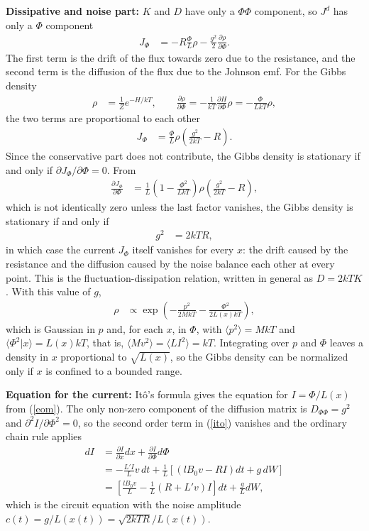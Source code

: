 \documentclass[11pt]{article}
\begin{document}
{\bf Dissipative and noise part:} $K$ and $D$ have only a $\Phi\Phi$ component, so $J^d$ has only a $\Phi$ component
\begin{align}
  J_{\Phi}&=-R\frac{\Phi}{L}\rho-\frac{g^2}{2}\frac{\partial\rho}{\partial\Phi}.
  \label{jphi}
\end{align}
The first term is the drift of the flux towards zero due to the resistance, and the second term is the diffusion of the flux due to the Johnson emf. For the Gibbs density
\begin{align}
  \rho&=\frac{1}{Z}e^{-H/kT},\qquad\frac{\partial\rho}{\partial\Phi}=-\frac{1}{kT}\frac{\partial H}{\partial\Phi}\rho=-\frac{\Phi}{LkT}\rho,
\end{align}
the two terms are proportional to each other
\begin{align}
  J_{\Phi}&=\frac{\Phi}{L}\rho\left(\frac{g^2}{2kT}-R\right).
\end{align}
Since the conservative part does not contribute, the Gibbs density is stationary if and only if $\partial J_{\Phi}/\partial\Phi=0$. From
\begin{align}
  \frac{\partial J_{\Phi}}{\partial\Phi}&=\frac{1}{L}\left(1-\frac{\Phi^2}{LkT}\right)\rho\left(\frac{g^2}{2kT}-R\right),
\end{align}
which is not identically zero unless the last factor vanishes, the Gibbs density is stationary if and only if
\begin{align}
  g^2&=2kTR,
  \label{fdr}
\end{align}
in which case the current $J_{\Phi}$ itself vanishes for every $x$: the drift caused by the resistance and the diffusion caused by the noise balance each other at every point. This is the fluctuation-dissipation relation, written in general as $D=2kTK$. With this value of $g$,
\begin{align}
  \rho&\propto\exp\left(-\frac{p^2}{2MkT}-\frac{\Phi^2}{2L(x)kT}\right),
  \label{gibbs}
\end{align}
which is Gaussian in $p$ and, for each $x$, in $\Phi$, with $\langle p^2\rangle=MkT$ and $\langle\Phi^2|x\rangle=L(x)kT$, that is, $\langle Mv^2\rangle=\langle LI^2\rangle=kT$. Integrating over $p$ and $\Phi$ leaves a density in $x$ proportional to $\sqrt{L(x)}$, so the Gibbs density can be normalized only if $x$ is confined to a bounded range.

{\bf Equation for the current:} It\^o's formula gives the equation for $I=\Phi/L(x)$ from (\ref{eom}). The only non-zero component of the diffusion matrix is $D_{\Phi\Phi}=g^2$ and $\partial^2I/\partial\Phi^2=0$, so the second order term in (\ref{ito}) vanishes and the ordinary chain rule applies
\begin{align}
  dI&=\frac{\partial I}{\partial x}dx+\frac{\partial I}{\partial\Phi}d\Phi\nonumber\\
  &=-\frac{L'I}{L}v\,dt+\frac{1}{L}\left[(lB_0v-RI)dt+g\,dW\right]\nonumber\\
  &=\left[\frac{lB_0v}{L}-\frac{1}{L}(R+L'v)I\right]dt+\frac{g}{L}dW,
  \label{dI}
\end{align}
which is the circuit equation with the noise amplitude $c(t)=g/L(x(t))=\sqrt{2kTR}/L(x(t))$.
\end{document}
